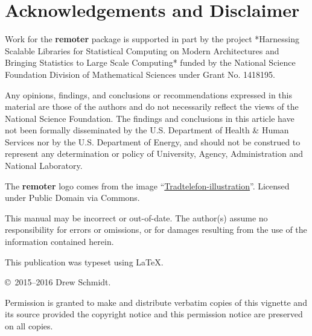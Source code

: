 \section*{Acknowledgements and Disclaimer}
Work for the \textbf{remoter} package is supported in part by the project 
*Harnessing Scalable Libraries for Statistical Computing on Modern Architectures 
and Bringing Statistics to Large Scale Computing* funded by the National 
Science Foundation Division of Mathematical Sciences under Grant No. 1418195.

Any opinions, findings, and conclusions or recommendations expressed in  this 
material are those of the authors and do not necessarily reflect the  views of 
the National Science Foundation.  The findings and conclusions in this article 
have not been formally disseminated by the U.S. Department of Health \& Human 
Services nor by the U.S. Department of Energy, and should not be construed to 
represent any determination or policy of University, Agency, Administration and 
National Laboratory.

The \textbf{remoter} logo comes from the image
``\href{https://commons.wikimedia.org/wiki/File:Tr\%C3\%A5dtelefon-illustration.png\#/media/File:Tr\%C3\%A5dtelefon-illustration.png}{Tradtelefon-illustration}''. 
Licensed under Public Domain via Commons.

This manual may be incorrect or out-of-date.  The author(s) assume
no responsibility for errors or omissions, or for damages resulting
from the use of the information contained herein.

This publication was typeset using \LaTeX.

\vfill

\null
\vfill
\copyright\ 2015--2016 Drew Schmidt.

Permission is granted to make and distribute verbatim copies of
this vignette and its source provided the copyright notice and
this permission notice are preserved on all copies.

